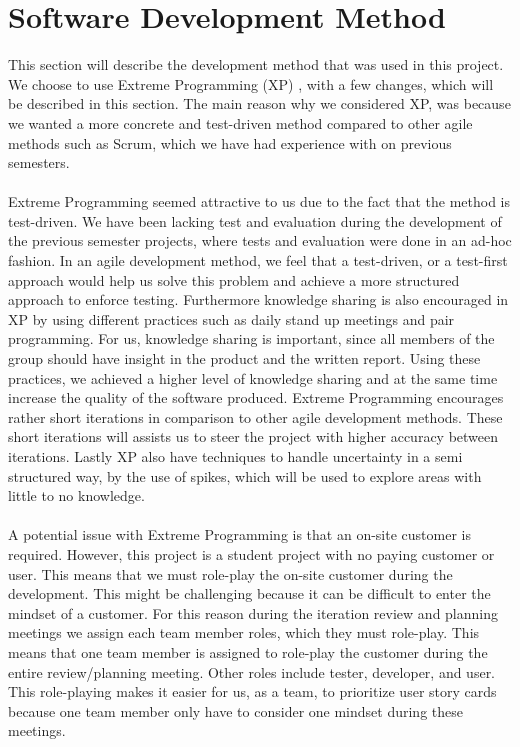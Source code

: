 
\section{Software Development Method}
\label{sec:software_development_method}

This section will describe the development method that was used in this project. We choose to use Extreme Programming (XP) \parencite{xp}, with a few changes, which will be described in this section. The main reason why we considered XP, was because we wanted a more concrete and test-driven method compared to other agile methods such as Scrum, which we have had experience with on previous semesters.
\\\\
Extreme Programming seemed attractive to us due to the fact that the method is test-driven. We have been lacking test and evaluation during the development of the previous semester projects, where tests and evaluation were done in an ad-hoc fashion. In an agile development method, we feel that a test-driven, or a test-first approach would help us solve this problem and achieve a more structured approach to enforce testing. Furthermore knowledge sharing is also encouraged in XP by using different practices such as daily stand up meetings and pair programming. For us, knowledge sharing is important, since all members of the group should have insight in the product and the written report. Using these practices, we achieved a higher level of knowledge sharing and at the same time increase the quality of the software produced. Extreme Programming encourages rather short iterations in comparison to other agile development methods. These short iterations will assists us to steer the project with higher accuracy between iterations. Lastly XP also have techniques to handle uncertainty in a semi structured way, by the use of spikes, which will be used to explore areas with little to no knowledge. 
\\\\
A potential issue with Extreme Programming is that an on-site customer is required. However, this project is a student project with no paying customer or user. This means that we must role-play the on-site customer during the development. This might be challenging because it can be difficult to enter the mindset of a customer. For this reason during the iteration review and planning meetings we assign each team member roles, which they must role-play. This means that one team member is assigned to role-play the customer during the entire review/planning meeting. Other roles include tester, developer, and user. This role-playing makes it easier for us, as a team, to prioritize user story cards because one team member only have to consider one mindset during these meetings.
